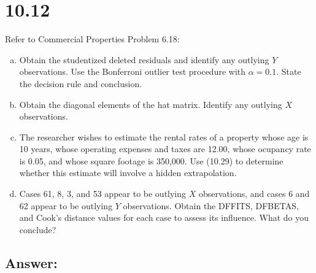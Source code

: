 \documentclass{article}
\begin{document}
\section{10.12}

Refer to Commercial Properties Problem 6.18:

\begin{enumerate}[a)]
\item{} Obtain the studentized deleted residuals and identify any outlying $Y$ observations. Use the Bonferroni outlier test procedure with $\alpha{} = 0.1$. State the decision rule and conclusion.
\item{} Obtain the diagonal elements of the hat matrix. Identify any outlying $X$ observations.
\item{} The researcher wishes to estimate the rental rates of a property whose age is 10 years, whose operating expenses and taxes are 12.00, whose ocupancy rate is 0.05, and whose square footage is 350,000. Use (10.29) to determine whether this estimate will involve a hidden extrapolation.
\item{} Cases 61, 8, 3, and 53 appear to be outlying $X$ observations, and cases 6 and 62 appear to be outlying $Y$ observations. Obtain the DFFITS, DFBETAS, and Cook's distance values for each case to assess its influence. What do you conclude?
\end{enumerate}

\subsection{Answer:}
\end{document}
